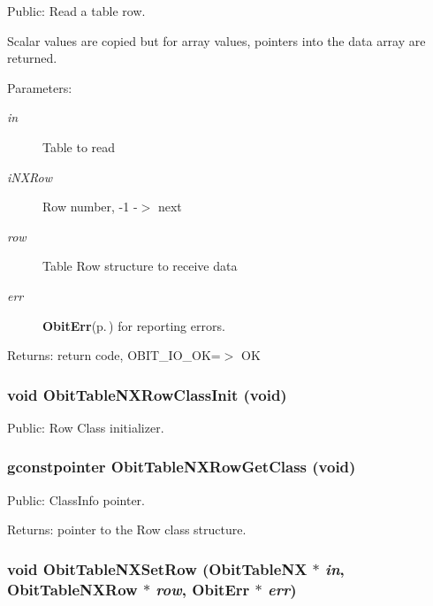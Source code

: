 Public: Read a table row. 

Scalar values are copied but for array values, pointers into the data array are returned. \begin{Desc}
\item[Parameters:]
\begin{description}
\item[{\em in}]Table to read \item[{\em i\-NXRow}]Row number, -1 -$>$ next \item[{\em row}]Table Row structure to receive data \item[{\em err}]{\bf Obit\-Err}{\rm (p.\,\pageref{structObitErr})} for reporting errors. \end{description}
\end{Desc}
\begin{Desc}
\item[Returns:]return code, OBIT\_\-IO\_\-OK=$>$ OK \end{Desc}
\subsubsection{\setlength{\rightskip}{0pt plus 5cm}void Obit\-Table\-NXRow\-Class\-Init (void)}\label{ObitTableNX_8h_a7}


Public: Row Class initializer. 

\subsubsection{\setlength{\rightskip}{0pt plus 5cm}gconstpointer Obit\-Table\-NXRow\-Get\-Class (void)}\label{ObitTableNX_8h_a9}


Public: Class\-Info pointer. 

\begin{Desc}
\item[Returns:]pointer to the Row class structure. \end{Desc}
\subsubsection{\setlength{\rightskip}{0pt plus 5cm}void Obit\-Table\-NXSet\-Row ({\bf Obit\-Table\-NX} $\ast$ {\em in}, {\bf Obit\-Table\-NXRow} $\ast$ {\em row}, {\bf Obit\-Err} $\ast$ {\em err})}\label{ObitTableNX_8h_a19}



